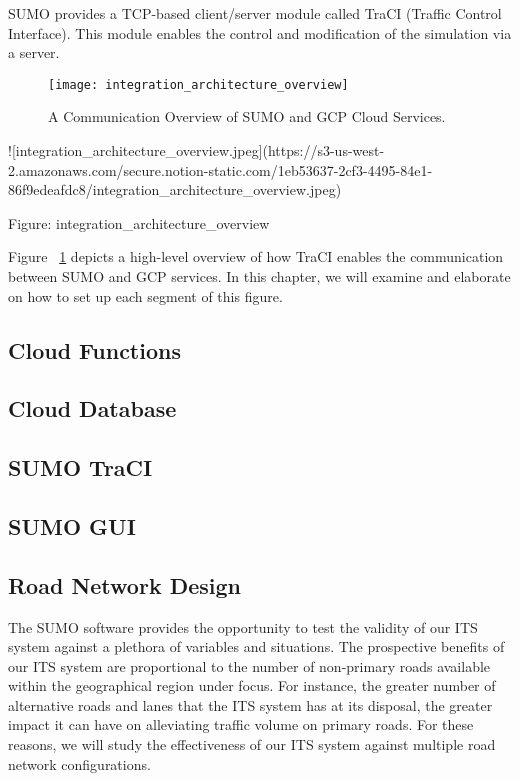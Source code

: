 SUMO provides a TCP-based client/server module called TraCI (Traffic Control Interface). This module enables the control and modification of the simulation via a server. 

\begin{figure}
\texttt{[image: integration\_architecture\_overview]}
\caption{A Communication Overview of SUMO and GCP Cloud Services.}
\label{fig:integration_architecture_overview}
\end{figure}

![integration_architecture_overview.jpeg](https://s3-us-west-2.amazonaws.com/secure.notion-static.com/1eb53637-2cf3-4495-84e1-86f9edeafdc8/integration_architecture_overview.jpeg)

Figure: integration_architecture_overview

Figure ~\ref{fig:integration_architecture_overview} depicts a high-level overview of how TraCI enables the communication between SUMO and GCP services. In this chapter, we will examine and elaborate on how to set up each segment of this figure.

\subsection{Cloud Functions}

\subsection{Cloud Database}

\subsection{SUMO TraCI}

\subsection{SUMO GUI}

\subsection{Road Network Design}

The SUMO software provides the opportunity to test the validity of our \acrshort{ITS} system against a plethora of variables and situations. The prospective benef\acrshort{its} of our \acrshort{ITS} system are proportional to the number of non-primary roads available within the geographical region under focus. For instance, the greater number of alternative roads and lanes that the \acrshort{ITS} system has at \acrshort{its} disposal, the greater impact it can have on alleviating traffic volume on primary roads. For these reasons, we will study the effectiveness of our \acrshort{ITS} system against multiple road network configurations.

